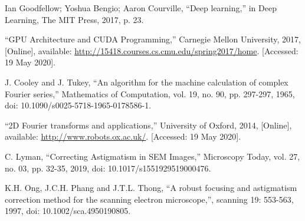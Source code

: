 \documentclass[12pt, twocolumn]{report}
\begin{document}
\begin{thebibliography}{00}
    Ian Goodfellow; Yoshua Bengio; Aaron Courville, ``Deep learning,'' in Deep Learning, The MIT Press, 2017, p. 23.

    ``GPU Architecture and CUDA Programming,'' Carnegie Mellon University, 2017, [Online], available: \url{http://15418.courses.cs.cmu.edu/spring2017/home}. [Accessed: 19 May 2020].

    J. Cooley and J. Tukey, ``An algorithm for the machine calculation of complex Fourier series,'' Mathematics of Computation, vol. 19, no. 90, pp. 297-297, 1965, doi: 10.1090/s0025-5718-1965-0178586-1.

    ``2D Fourier transforms and applications,'' University of Oxford, 2014, [Online], available: \url{http://www.robots.ox.ac.uk/}. [Accessed: 19 May 2020].

    C. Lyman, ``Correcting Astigmatism in SEM Images,'' Microscopy Today, vol. 27, no. 03, pp. 32-35, 2019, doi: 10.1017/s1551929519000476.

    K.H. Ong, J.C.H. Phang and J.T.L. Thong, ``A robust focusing and astigmatism correction method for the scanning electron microscope,'', scanning 19: 553-563, 1997, doi: 10.1002/sca.4950190805.
\end{thebibliography}
\end{document}
